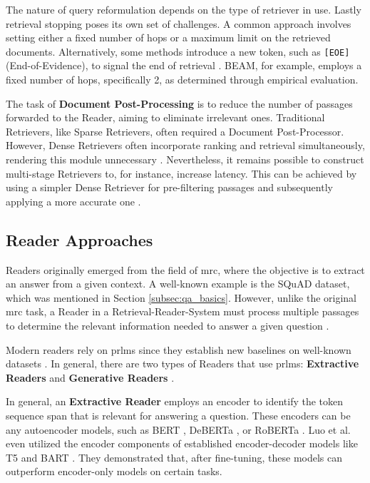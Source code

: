 The nature of query reformulation depends on the type of retriever in use. Lastly retrieval stopping poses its own set of challenges. A common approach involves setting either a fixed number of hops or a maximum limit on the retrieved documents. Alternatively, some methods introduce a new token, such as \verb|[EOE]| (End-of-Evidence), to signal the end of retrieval \cite{zhu_retrieving_2021}. BEAM, for example, employs a fixed number of hops, specifically 2, as determined through empirical evaluation.

The task of \textbf{Document Post-Processing} is to reduce the number of passages forwarded to the Reader, aiming to eliminate irrelevant ones. Traditional Retrievers, like Sparse Retrievers, often required a Document Post-Processor. However, Dense Retrievers often incorporate ranking and retrieval simultaneously, rendering this module unnecessary \cite{zhu_retrieving_2021}. Nevertheless, it remains possible to construct multi-stage Retrievers to, for instance, increase latency. This can be achieved by using a simpler Dense Retriever for pre-filtering passages and subsequently applying a more accurate one \cite{liu_dense_2021}.


\subsection{Reader Approaches}
\label{subsec:qa_user_interaction}

Readers originally emerged from the field of \gls{mrc}, where the objective is to extract an answer from a given context. A well-known example is the SQuAD \cite{rajpurkar_squad_2016} dataset, which was mentioned in Section \ref{subsec:qa_basics}. However, unlike the original \gls{mrc} task, a Reader in a Retrieval-Reader-System must process multiple passages to determine the relevant information needed to answer a given question \cite{zhu_retrieving_2021}. 

Modern readers rely on \gls{prlm}s since they establish new baselines on well-known datasets \cite{luo_choose_2022}. In general, there are two types of Readers that use \gls{prlm}s: \textbf{Extractive Readers} and \textbf{Generative Readers} \cite{jurafsky_speech_2023,zhu_retrieving_2021,luo_choose_2022}.

In general, an \textbf{Extractive Reader} employs an encoder to identify the token sequence span that is relevant for answering a question. These encoders can be any autoencoder models, such as BERT \cite{devlin_bert_2019}, DeBERTa \cite{he_deberta_2020}, or RoBERTa \cite{liu_roberta_2019}. Luo et al. \cite{luo_choose_2022} even utilized the encoder components of established encoder-decoder models like T5 \cite{raffel_exploring_2023} and BART \cite{lewis_bart_2019}. They demonstrated that, after fine-tuning, these models can outperform encoder-only models on certain tasks.

